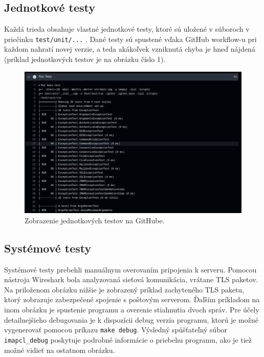 \documentclass[a4paper, 11pt]{article}
\begin{document}
	\subsection{Jednotkové testy}
	Každá trieda obsahuje vlastné jednotkové testy, ktoré sú uložené v súboroch v priečinku \texttt{test/unit/...} . Dané testy sú spustené vďaka GitHub workflow-u pri každom nahratí novej verzie, a teda akákoľvek vzniknutá chyba je hneď nájdená (príklad jednotkových testov je na obrázku číslo 1).
	\label{subsection:testunit}
	\begin{figure}[!ht]
		\centering
		\vspace{1cm}
		\includegraphics[width=0.9\linewidth]{res/test_unit.png}
		\caption{Zobrazenie jednotkových testov na GitHube.}
		\label{figure:testunit}
	\end{figure}

	\subsection{Systémové testy}
	Systémové testy prebehli manuálnym overovaním pripojenia k serveru. Pomocou nástroja Wireshark bola analyzovaná sieťová komunikácia, vrátane TLS paketov. Na priloženom obrázku nižšie je zobrazený príklad zachyteného TLS paketu, ktorý zobrazuje zabezpečené spojenie s poštovým serverom.\newline
	Ďaľším príkladom na inom obrázku je spustenie programu a overenie stiahnutia dvoch správ.\newline
	Pre účely detailnejšieho debugovania je k dispozícii debug verzia programu, ktorú je možné vygenerovať pomocou príkazu \texttt{make debug}. Výsledný spúšťateľný súbor \texttt{imapcl\_debug} poskytuje podrobné informácie o priebehu programu, ako je tiež možné vidieť na ostatnom obrázku.
\end{document}
